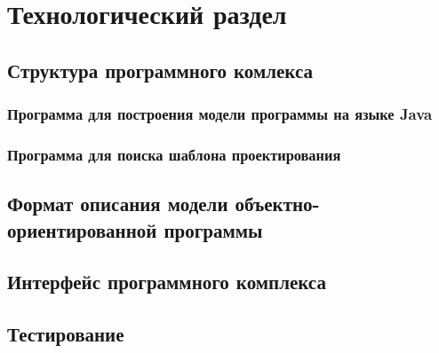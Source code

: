 \chapter{Технологический раздел}
\label{cha:implementation}

\section{Структура программного комлекса}
\subsection{Программа для построения модели программы на языке Java}
\subsection{Программа для поиска шаблона проектирования}
\section{Формат описания модели объектно-ориентированной программы}
\section{Интерфейс программного комплекса}
\section{Тестирование}
